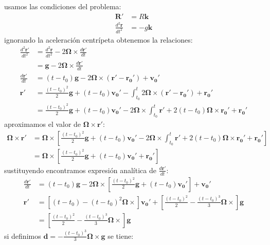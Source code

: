 \documentclass{article}
\begin{document}
    \begin{tcolorbox}
    usamos las condiciones del problema:
    \begin{align*}
        \bm{R'} &= R\bm{k} \\
        \frac{d^2\bm{r}}{dt^2} &= -g\bm{k} 
    \end{align*}
    ignorando la aceleración centrípeta obtenemos la relaciones:
    \begin{align*}
        \frac{d^2\bm{r'}}{dt^2}
        &= \frac{d^2\bm{r}}{dt^2} - 2\bm{\Omega} \times \frac{d\bm{r'}}{dt} \\
        &= \bm{g} - 2\bm{\Omega} \times \frac{d\bm{r'}}{dt} \\
        \frac{d\bm{r'}}{dt}
        &= (t-t_0)\bm{g} - 2\bm{\Omega} \times (\bm{r'} - \bm{r_0'}) + \bm{v_0'} \\
        \bm{r'}
        &= \frac{(t-t_0)^2}{2}\bm{g} + (t-t_0)\bm{v_0'} - \int_{t_0}^t 2\bm{\Omega} \times (\bm{r'} - \bm{r_0'}) + \bm{r_0'} \\
        &= \frac{(t-t_0)^2}{2}\bm{g} + (t-t_0)\bm{v_0'} - 2\bm{\Omega} \times \int_{t_0}^t \bm{r'} + 2(t-t_0)\bm{\Omega} \times \bm{r_0'} + \bm{r_0'} 
    \end{align*}
    aproximamos el valor de $\bm{\Omega} \times \bm{r'}$:
    \begin{align*}
        \bm{\Omega} \times \bm{r'}
        &= \bm{\Omega} \times 
        \left[ \frac{(t-t_0)^2}{2}\bm{g} + (t-t_0)\bm{v_0'} - 2\bm{\Omega} \times \int_{t_0}^t \bm{r'} + 2(t-t_0)\bm{\Omega} \times \bm{r_0'} + \bm{r_0'} \right] \\
        &= \bm{\Omega} \times 
        \left[ \frac{(t-t_0)^2}{2}\bm{g} + (t-t_0)\bm{v_0'} + \bm{r_0'} \right]
    \end{align*}
    sustituyendo encontramos expresión analítica de $\frac{d\bm{r'}}{dt}$:
    \begin{align*}
        \frac{d\bm{r'}}{dt}
        &=(t-t_0)\bm{g} - 2\bm{\Omega} \times 
        \left[ \frac{(t-t_0)^2}{2}\bm{g} + (t-t_0)\bm{v_0'} \right] + \bm{v_0'} \\
        \bm{r'}
        &=\left[ (t-t_0) - (t-t_0)^2\bm{\Omega} \times \right] \bm{v_0'} 
        + \left[ \frac{(t-t_0)^2}{2} - \frac{(t-t_0)^3}{3} \bm{\Omega} \times \right]\bm{g} \\
        &=\left[ \frac{(t-t_0)^2}{2} - \frac{(t-t_0)^3}{3} \bm{\Omega} \times \right]  \bm{g} 
    \end{align*}
    si definimos $\bm{d} = -\frac{(t-t_0)^3}{3} \bm{\Omega} \times \bm{g}$ se tiene:

\end{tcolorbox}
\end{document}
